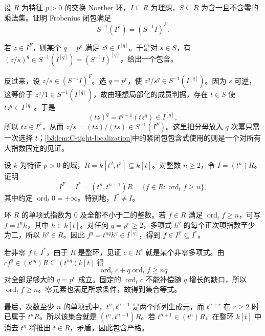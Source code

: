 \begin{exercise}\label{b3:ex:C-frobenius-closure-localization}
	设 \(R\) 为特征 \(p>0\) 的交换 Noether 环，\(I\subseteq R\) 为理想，\(S\subseteq R\) 为含一且不含零的乘法集。证明 Frobenius 闭包满足
	\[
		S^{-1}(I^F)=(S^{-1}I)^F.
	\]
\end{exercise}
\begin{solution}
	若 \(z\in I^F\)，则某个 \(q=p^e\) 满足 \(z^q\in I^{[q]}\)。于是对 \(s\in S\)，有 \((z/s)^q\in S^{-1}(I^{[q]})=(S^{-1}I)^{[q]}\)，给出一个包含。

	反过来，设 \(z/s\in(S^{-1}I)^F\)。选 \(q=p^e\)，使 \(z^q/s^q\in S^{-1}(I^{[q]})\)。因为 \(s\) 可逆，这等价于 \(z^q/1\in S^{-1}(I^{[q]})\)，故由理想局部化的成员判据，存在 \(t\in S\) 使 \(tz^q\in I^{[q]}\)。于是
	\[
		(tz)^q=t^{q-1}(tz^q)\in I^{[q]},
	\]
	所以 \(tz\in I^F\)，从而 \(z/s=(tz)/(ts)\in S^{-1}(I^F)\)。这里把分母放入 \(q\) 次幂只需一次选择 \(t\)；\cref{b3:lem:C-tight-localization}中的紧闭包包含式使用的则是一个对所有大指数固定的见证。
\end{solution}

\begin{exercise}\label{b3:ex:C-cusp-full-tight-closure}
	设 \(k\) 为特征 \(p>0\) 的域，\(R=k[t^2,t^3]\subseteq k[t]\)。对整数 \(n\ge2\)，令 \(I=(t^n)R\)。证明
	\[
		I^F=I^*=(t^n,t^{n+1})R
		=\{f\in R:\operatorname{ord}_t f\ge n\},
	\]
	其中约定 \(\operatorname{ord}_t0=+\infty\)。特别地，\(I^*\ne I\)。
\end{exercise}
\begin{solution}
	环 \(R\) 的单项式指数为 \(0\) 及全部不小于二的整数。若 \(f\in R\) 满足 \(\operatorname{ord}_t f\ge n\)，可写 \(f=t^n h\)，其中 \(h\in k[t]\)。对任何 \(q=p^e\ge2\)，多项式 \(h^q\) 的每个正次项指数至少为二，所以 \(h^q\in R\)。因此 \(f^q=t^{nq}h^q\in I^{[q]}\)，得到 \(f\in I^F\subseteq I^*\)。

	若非零 \(f\in I^*\)，由于 \(R\) 是整环，见证 \(c\in R^\circ\) 就是某个非零多项式。由 \(cf^q\in(t^{nq})R\subseteq(t^{nq})k[t]\) 得
	\[
		\operatorname{ord}_t c+q\operatorname{ord}_t f\ge nq
	\]
	对全部足够大的 \(q=p^e\) 成立。固定的 \(\operatorname{ord}_t c\) 不能补偿随 \(q\) 增长的缺口，所以 \(\operatorname{ord}_t f\ge n\)。零元素也满足所求条件，故得到集合等式。

	最后，次数至少 \(n\) 的单项式中，\(t^n,t^{n+1}\) 是两个所列生成元，而 \(t^{n+r}\) 在 \(r\ge2\) 时已属于 \(t^nR\)。所以该集合就是 \((t^n,t^{n+1})R\)。若 \(t^{n+1}\in(t^n)R\)，在整环 \(k[t]\) 中消去 \(t^n\) 将推出 \(t\in R\)，矛盾，因此包含严格。
\end{solution}

